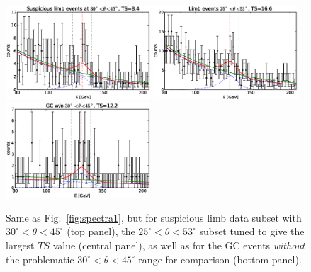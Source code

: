 \documentclass[aps,twocolumn,prd,superscriptaddress,showpacs,nofootinbib,fixfloat]{revtex4}
\begin{document}
\begin{figure}
  \centering
  \includegraphics[width=0.48\textwidth]{plots/counts_suspiciousLimb.eps}
  \includegraphics[width=0.48\textwidth]{plots/counts_suspiciousLimb_tuned.eps}
  \includegraphics[width=0.48\textwidth]{plots/counts_GC_wo3045.eps}
  \caption{Same as Fig.~\ref{fig:spectra1}, but for
  suspicious limb data subset with
  $30^\circ<\theta<45^\circ$ (top panel),
  the $25^\circ<\theta<53^\circ$ subset tuned to give the largest $TS$ value (central panel),
  as well as for the
  GC events \emph{without} the problematic
  $30^\circ<\theta<45^\circ$ range for comparison (bottom panel).}
  \label{fig:spectra2}
\end{figure}
\end{document}
